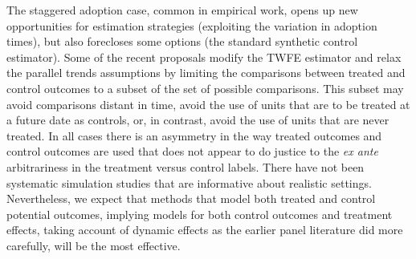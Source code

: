 \documentclass[letterpaper,12pt,leqno]{article}
\begin{document}
The staggered adoption case, common in empirical work, opens up new opportunities for estimation strategies (exploiting the variation in adoption times), but also forecloses some options (the standard synthetic control estimator).
Some of the recent proposals modify the TWFE estimator and relax the parallel trends assumptions by limiting the comparisons between treated and control outcomes to a subset of the set of possible comparisons. This subset may avoid comparisons distant in time, avoid the use of units that are to be treated at a future date as controls, or, in contrast, avoid the use of units that are never treated. In all cases there is an asymmetry in the way treated outcomes and control outcomes are used that does not appear to do justice to the {\it ex ante} arbitrariness in the treatment versus control labels. There have not been systematic simulation studies that are informative about realistic settings. Nevertheless, we expect that methods that model both treated and control potential outcomes, implying models for both control outcomes and treatment effects, taking account of dynamic effects as the earlier panel literature did more carefully, will be the most effective. 



\end{document}
